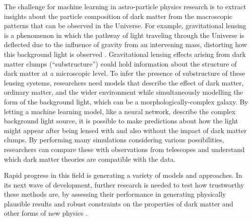 The challenge for machine learning in astro-particle physics research is
to extract insights about the particle composition of dark matter from
the macroscopic patterns that can be observed in the Universe. For
example, gravitational lensing is a phenomenon in which the pathway of
light traveling through the Universe is deflected due to the influence
of gravity from an intervening mass, distorting how this background
light is observed \citep{Mishra-strong22}. Gravitational lensing
effects arising from dark matter clumps (``substructure'') could hold
information about the structure of dark matter at a microscopic level.
To infer the presence of substructure of these lensing systems,
researchers need models that describe the effect of dark matter,
ordinary matter, and the wider environment while simultaneously
modelling the form of the background light, which can be a
morphologically-complex galaxy. By letting a machine learning model,
like a neural network, describe the complex background light source, it
is possible to make predictions about how the light might appear after
being lensed with and also without the impact of dark matter clumps. By
performing many simulations considering various possibilities,
researchers can compare these with observations from telescopes and
understand which dark matter theories are compatible with the data.

Rapid progress in this field is generating a variety of models and
approaches. In its next wave of development, further research is needed
to test how trustworthy these methods are, by assessing their
performance in generating physically plausible results and robust
constraints on the properties of dark matter and other forms of new
physics \citep{Dworkin-cosmology22}.

